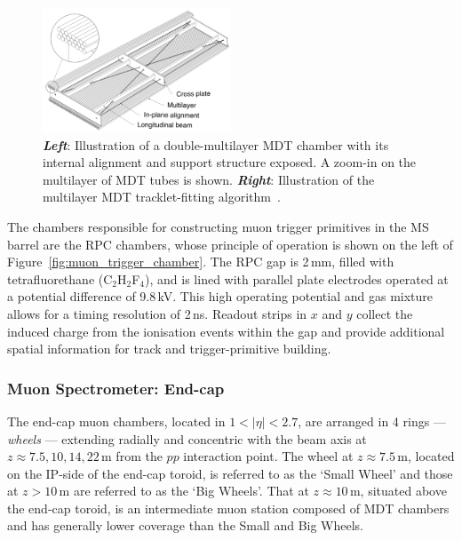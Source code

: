 \begin{figure}[!htb]
    \begin{center}
        \includegraphics[width=0.5\textwidth]{figures/chapter2/muon_spec/mdt_chamber}
        \caption{
            \textbf{\textit{Left}}: Illustration of a double-multilayer MDT chamber with its internal alignment
                and support structure exposed. A zoom-in on the multilayer of MDT tubes is shown.
            \textbf{\textit{Right}}: Illustration of the multilayer MDT tracklet-fitting algorithm~\cite{MDTtrackfit}.
        }
        \label{fig:mdt_chamber}
    \end{center}
\end{figure}

The chambers responsible for constructing muon trigger primitives in the MS barrel
are the RPC chambers, whose principle of operation is shown on the left of Figure~\ref{fig:muon_trigger_chamber}. 
The RPC gap is 2\,mm, filled with tetrafluorethane (C$_2$H$_2$F$_4$), and is lined with
parallel plate electrodes operated at a potential difference of 9.8\,kV. This high operating
potential and gas mixture allows for a timing resolution of 2\,ns. Readout strips in $x$ and $y$
collect the induced charge from the ionisation events within the gap and provide
additional spatial information for track and trigger-primitive building.

\subsubsection{Muon Spectrometer: End-cap}
\label{sec:ms_endcap}

The end-cap muon chambers, located in $1 < \lvert \eta \rvert < 2.7$, are arranged
in 4 rings --- \textit{wheels} ---  extending radially and concentric with the beam axis at $z \approx 7.5, 10, 14, 22$\,m
from the $pp$ interaction point.
The wheel at $z\approx 7.5$\,m, located on the IP-side of the end-cap toroid, is referred to as the `Small Wheel' and those at $z>10$\,m are
referred to as the `Big Wheels'.
That at $z\approx 10$\,m, situated above the end-cap toroid, is an intermediate muon station composed of MDT chambers and has generally lower coverage than the
Small and Big Wheels.

